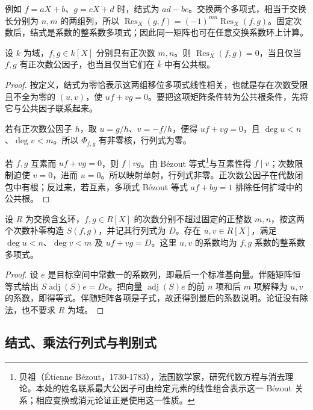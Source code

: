 例如 \(f=aX+b\)、\(g=cX+d\) 时，结式为 \(ad-bc\)。交换两个多项式，相当于交换长分别为 \(n,m\) 的两组列，所以 \(\operatorname{Res}_X(g,f)=(-1)^{mn}\operatorname{Res}_X(f,g)\)。固定次数后，结式是系数的整系数多项式；因此同一矩阵也可在任意交换系数环上计算。

\begin{proposition}\label{b3:prop:resultant-common-factor}
	设 \(k\) 为域，\(f,g\in k[X]\) 分别具有正次数 \(m,n\)。则 \(\operatorname{Res}_X(f,g)=0\)，当且仅当 \(f,g\) 有正次数公因子，也当且仅当它们在 \(\overline k\) 中有公共根。
\end{proposition}
\begin{proof}
	按定义，结式为零恰表示这两组移位多项式线性相关，也就是存在次数受限且不全为零的 \((u,v)\)，使 \(uf+vg=0\)。要把这项矩阵条件转为公共根条件，先将它与公共因子联系起来。

	若有正次数公因子 \(h\)，取 \(u=g/h\)、\(v=-f/h\)，便得 \(uf+vg=0\)，且 \(\deg u<n\)、\(\deg v<m\)。所以 \(\Phi_{f,g}\) 有非零核，行列式为零。

	若 \(f,g\) 互素而 \(uf+vg=0\)，则 \(f\mid vg\)。由 Bézout 等式\footnote{贝祖（Étienne Bézout，1730-1783），法国数学家，研究代数方程与消去理论。本处的姓名联系最大公因子可由给定元素的线性组合表示这一 Bézout 关系；相应变换或消元论证正是使用这一性质。}与互素性得 \(f\mid v\)；次数限制迫使 \(v=0\)，进而 \(u=0\)。所以映射单射，行列式非零。正次数公因子在代数闭包中有根；反过来，若互素，多项式 Bézout 等式 \(af+bg=1\) 排除任何扩域中的公共根。
\end{proof}

\begin{proposition}\label{b3:prop:resultant-bezout}
	设 \(R\) 为交换含幺环，\(f,g\in R[X]\) 的次数分别不超过固定的正整数 \(m,n\)，按这两个次数补零构造 \(S(f,g)\)，并记其行列式为 \(D\)。存在 \(u,v\in R[X]\)，满足 \(\deg u<n\)、\(\deg v<m\) 及 \(uf+vg=D\)。这里 \(u,v\) 的系数均为 \(f,g\) 系数的整系数多项式。
\end{proposition}
\begin{proof}
	设 \(e\) 是目标空间中常数一的系数列，即最后一个标准基向量。伴随矩阵恒等式给出 \(S\operatorname{adj}(S)e=De\)。把向量 \(\operatorname{adj}(S)e\) 的前 \(n\) 项和后 \(m\) 项解释为 \(u,v\) 的系数，即得等式。伴随矩阵各项是子式，故还得到最后的系数说明。论证没有除法，也不要求 \(R\) 为域。
\end{proof}

\subsection{结式、乘法行列式与判别式}
\label{b3:subsec:0806:02}

